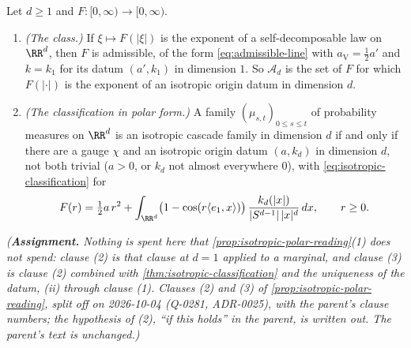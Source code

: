 \begin{proposition}
\label{prop:isotropic-polar-classification}
\leanok
Let $d \ge 1$ and $F : [0,\infty) \to [0,\infty)$.
\begin{enumerate}
\item[(2)] \emph{(The class.)} If $\xi \mapsto F(|\xi|)$ is the exponent of a self-decomposable law
on $\RR^d$, then $F$ is admissible, of the form \ref{eq:admissible-line} with
$a_{\mathrm V} = \tfrac12 a'$ and $k = k_1$ for its datum $(a',k_1)$ in dimension $1$. So
$\mathcal{A}_d$ is the set of $F$ for which $F(|\cdot|)$ is the exponent of an isotropic origin
datum in dimension $d$.
\item[(3)] \emph{(The classification in polar form.)} A family $(\mu_{s,t})_{0 \le s \le t}$ of
probability measures on $\RR^d$ is an isotropic cascade family in dimension $d$ if and only if
there are a gauge $\chi$ and an isotropic origin datum $(a,k_d)$ in dimension $d$, not both trivial
($a > 0$, or $k_d$ not almost everywhere $0$), with \ref{eq:isotropic-classification} for
\[
  F(r) = \tfrac12 a\,r^2 + \int_{\RR^d}\bigl(1 - \cos(r\langle e_1,x\rangle)\bigr)\,
    \frac{k_d(|x|)}{|S^{d-1}|\,|x|^d}\,dx , \qquad r \ge 0 .
\]
\end{enumerate}
\statusA\quad{}\quad{}\quad{}\quad\emph{(\textbf{Assignment.} Nothing is
spent here that \ref{prop:isotropic-polar-reading}(1) does not spend: clause (2) is that clause at
$d = 1$ applied to a marginal, and clause (3) is clause (2) combined with
\ref{thm:isotropic-classification} and the uniqueness of the datum, (ii) through clause
(1). Clauses (2) and (3) of \ref{prop:isotropic-polar-reading}, split off on 2026-10-04 (Q-0281,
ADR-0025), with the parent's clause numbers; the hypothesis of (2), ``if this holds'' in the parent,
is written out. The parent's text is unchanged.)}
\end{proposition}

